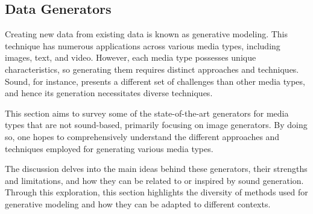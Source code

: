 \subsection{Data Generators} \label{sec:data-generators}

Creating new data from existing data is known as generative modeling. This technique has numerous applications across various media types, including images, text, and video. However, each media type possesses unique characteristics, so generating them requires distinct approaches and techniques. Sound, for instance, presents a different set of challenges than other media types, and hence its generation necessitates diverse techniques.

This section aims to survey some of the state-of-the-art generators for media types that are not sound-based, primarily focusing on image generators. By doing so, one hopes to comprehensively understand the different approaches and techniques employed for generating various media types.

The discussion delves into the main ideas behind these generators, their strengths and limitations, and how they can be related to or inspired by sound generation. Through this exploration, this section highlights the diversity of methods used for generative modeling and how they can be adapted to different contexts.

